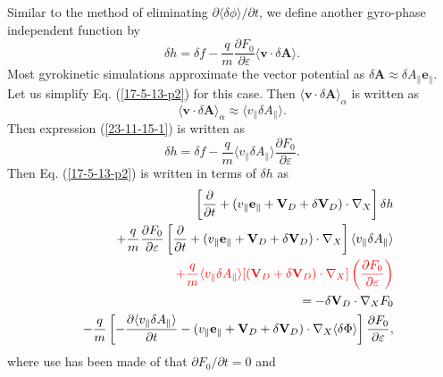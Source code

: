 \documentclass{llncs}
\newcommand{\tmcolor}[2]{{\color{#1}{#2}}}
\begin{document}
Similar to the method of eliminating $\partial \langle \delta \phi \rangle /
\partial t$, we define another gyro-phase independent function by
\begin{equation}
  \label{23-11-15-1} \delta h = \delta f - \frac{q}{m} \frac{\partial
  F_0}{\partial \varepsilon} \langle \mathbf{v} \cdot \delta \mathbf{A}
  \rangle .
\end{equation}
Most gyrokinetic simulations approximate the vector potential as $\delta
\mathbf{A} \approx \delta A_{\parallel} \mathbf{e}_{\parallel}$. Let us
simplify Eq. (\ref{17-5-13-p2}) for this case. Then $\langle \mathbf{v} \cdot
\delta \mathbf{A} \rangle_{\alpha}$ is written as
\begin{equation}
  \label{19-3-26-e1} \langle \mathbf{v} \cdot \delta \mathbf{A}
  \rangle_{\alpha} \approx \langle v_{\parallel} \delta A_{\parallel} \rangle
  .
\end{equation}
Then expression (\ref{23-11-15-1}) is written as
\begin{equation}
  \delta h = \delta f - \frac{q}{m} \langle v_{\parallel} \delta A_{\parallel}
  \rangle \frac{\partial F_0}{\partial \varepsilon} .
\end{equation}
Then Eq. (\ref{17-5-13-p2}) is written in terms of $\delta h$ as
\begin{eqnarray}
  &  & \left[ \frac{\partial}{\partial t} + (v_{\parallel}
  \mathbf{e}_{\parallel} +\mathbf{V}_D + \delta \mathbf{V}_D) \cdot \nabla_X
  \right] \delta h \nonumber\\
  &  & + \frac{q}{m} \frac{\partial F_0}{\partial \varepsilon} \left[
  \frac{\partial}{\partial t} + (v_{\parallel} \mathbf{e}_{\parallel}
  +\mathbf{V}_D + \delta \mathbf{V}_D) \cdot \nabla_X \right]  \langle
  v_{\parallel} \delta A_{\parallel} \rangle \nonumber\\
  &  & \tmcolor{red}{+ \frac{q}{m} \langle v_{\parallel} \delta A_{\parallel}
  \rangle [(\mathbf{V}_D + \delta \mathbf{V}_D) \cdot \nabla_X] \left(
  \frac{\partial F_0}{\partial \varepsilon} \right)} \nonumber\\
  &  & = - \delta \mathbf{V}_D \cdot \nabla_X F_0 \nonumber\\
  &  & - \frac{q}{m} \left[ - \frac{\partial \langle v_{\parallel} \delta
  A_{\parallel} \rangle}{\partial t} - (v_{\parallel} \mathbf{e}_{\parallel}
  +\mathbf{V}_D + \delta \mathbf{V}_D) \cdot \nabla_X \langle \delta \Phi
  \rangle \right] \frac{\partial F_0}{\partial \varepsilon}, 
\end{eqnarray}
where use has been made of that $\partial F_0 / \partial t = 0$ and
\end{document}

